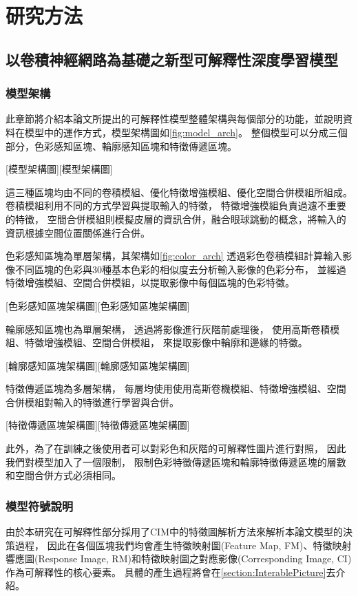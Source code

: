 \documentclass[class=NCU_thesis, crop=false]{standalone}
\begin{document}
\chapter{研究方法}

\section{以卷積神經網路為基礎之新型可解釋性深度學習模型}
\subsection{模型架構}

此章節將介紹本論文所提出的可解釋性模型整體架構與每個部分的功能，並說明資料在模型中的運作方式，模型架構圖如\cref{fig:model_arch}。
整個模型可以分成三個部分，色彩感知區塊、輪廓感知區塊和特徵傳遞區塊。

[模型架構圖][模型架構圖]

\pagebreak

這三種區塊均由不同的卷積模組、優化特徵增強模組、優化空間合併模組所組成。
卷積模組利用不同的方式學習與提取輸入的特徵，
特徵增強模組負責過濾不重要的特徵，
空間合併模組則模擬皮層的資訊合併，融合眼球跳動的概念，將輸入的資訊根據空間位置關係進行合併。

色彩感知區塊為單層架構，其架構如\cref{fig:color_arch}
透過彩色卷積模組計算輸入影像不同區塊的色彩與30種基本色彩的相似度去分析輸入影像的色彩分布，
並經過特徵增強模組、空間合併模組，以提取影像中每個區塊的色彩特徵。

[色彩感知區塊架構圖][色彩感知區塊架構圖]

輪廓感知區塊也為單層架構，
透過將影像進行灰階前處理後，
使用高斯卷積模組、特徵增強模組、空間合併模組，
來提取影像中輪廓和邊緣的特徵。

[輪廓感知區塊架構圖][輪廓感知區塊架構圖]

特徵傳遞區塊為多層架構，
每層均使用使用高斯卷機模組、特徵增強模組、空間合併模組對輸入的特徵進行學習與合併。

[特徵傳遞區塊架構圖][特徵傳遞區塊架構圖]

此外，為了在訓練之後使用者可以對彩色和灰階的可解釋性圖片進行對照，
因此我們對模型加入了一個限制，
限制色彩特徵傳遞區塊和輪廓特徵傳遞區塊的層數和空間合併方式必須相同。

\pagebreak
\subsection{模型符號說明}
	由於本研究在可解釋性部分採用了CIM中的特徵圖解析方法來解析本論文模型的決策過程，
	因此在各個區塊我們均會產生特徵映射圖(Feature Map, FM)、特徵映射響應圖(Response Image, RM)和特徵映射圖之對應影像(Corresponding Image, CI)作為可解釋性的核心要素。
	具體的產生過程將會在\cref{section:InterablePicture}去介紹。
\end{document}
